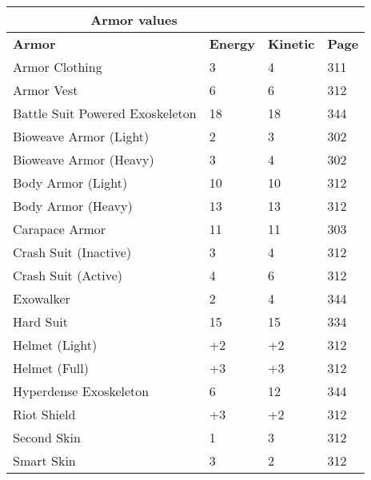 \begin{table} \begin{tabular}{|l|l|l|l|} \hline

\multicolumn{2}{|c|}{\textbf{Armor values}}	\\ \hline

\textbf{Armor}	&\textbf{Energy} &\textbf{Kinetic}	&\textbf{Page} \\ \hline

Armor Clothing	&3	&4	&311	\\ \hline

Armor Vest	&6	&6	&312	\\ \hline

Battle Suit Powered Exoskeleton	&18	&18	&344	\\ \hline

Bioweave Armor (Light)	&2	&3	&302	\\ \hline

Bioweave Armor (Heavy)	&3	&4	&302	\\ \hline

Body Armor (Light)	&10	&10	&312	\\ \hline

Body Armor (Heavy)	&13	&13	&312	\\ \hline

Carapace Armor	&11	&11	&303	\\ \hline

Crash Suit (Inactive)	&3	&4	&312	\\ \hline

Crash Suit (Active)	&4	&6	&312	\\ \hline

Exowalker	&2	&4	&344	\\ \hline

Hard Suit	&15	&15	&334	\\ \hline

Helmet (Light)	&+2	&+2	&312	\\ \hline

Helmet (Full)	&+3	&+3	&312	\\ \hline

Hyperdense Exoskeleton	&6	&12	&344	\\ \hline

Riot Shield	&+3	&+2	&312	\\ \hline

Second Skin	&1	&3	&312	\\ \hline

Smart Skin	&3	&2	&312	\\ \hline


\end{tabular}
\end{table}
